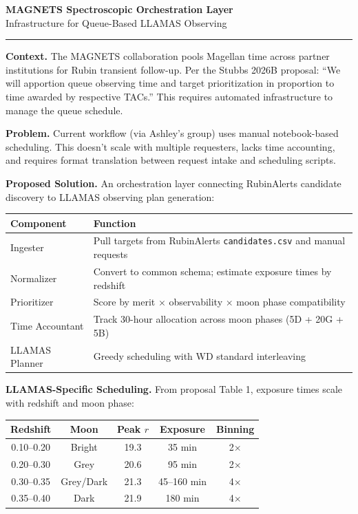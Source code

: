 \documentclass[10pt]{article}
\begin{document}
\begin{center}
{\Large \textbf{MAGNETS Spectroscopic Orchestration Layer}}\\[4pt]
{\normalsize Infrastructure for Queue-Based LLAMAS Observing}
\end{center}

\vspace{-8pt}
\hrule
\vspace{8pt}

\textbf{Context.} The MAGNETS collaboration pools Magellan time across partner institutions for Rubin transient follow-up. Per the Stubbs 2026B proposal: ``We will apportion queue observing time and target prioritization in proportion to time awarded by respective TACs.'' This requires automated infrastructure to manage the queue schedule.

\textbf{Problem.} Current workflow (via Ashley's group) uses manual notebook-based scheduling. This doesn't scale with multiple requesters, lacks time accounting, and requires format translation between request intake and scheduling scripts.

\textbf{Proposed Solution.} An orchestration layer connecting RubinAlerts candidate discovery to LLAMAS observing plan generation:

\vspace{-4pt}
\begin{center}
\small
\begin{tabular}{@{}p{2.8cm}p{10cm}@{}}
\toprule
\textbf{Component} & \textbf{Function} \\
\midrule
Ingester & Pull targets from RubinAlerts \texttt{candidates.csv} and manual requests \\
Normalizer & Convert to common schema; estimate exposure times by redshift \\
Prioritizer & Score by merit $\times$ observability $\times$ moon phase compatibility \\
Time Accountant & Track 30-hour allocation across moon phases (5D + 20G + 5B) \\
LLAMAS Planner & Greedy scheduling with WD standard interleaving \\
\bottomrule
\end{tabular}
\end{center}

\textbf{LLAMAS-Specific Scheduling.} From proposal Table 1, exposure times scale with redshift and moon phase:

\vspace{-4pt}
\begin{center}
\small
\begin{tabular}{@{}ccccc@{}}
\toprule
\textbf{Redshift} & \textbf{Moon} & \textbf{Peak $r$} & \textbf{Exposure} & \textbf{Binning} \\
\midrule
0.10--0.20 & Bright & 19.3 & 35 min & 2$\times$ \\
0.20--0.30 & Grey & 20.6 & 95 min & 2$\times$ \\
0.30--0.35 & Grey/Dark & 21.3 & 45--160 min & 4$\times$ \\
0.35--0.40 & Dark & 21.9 & 180 min & 4$\times$ \\
\bottomrule
\end{tabular}
\end{center}
\end{document}
